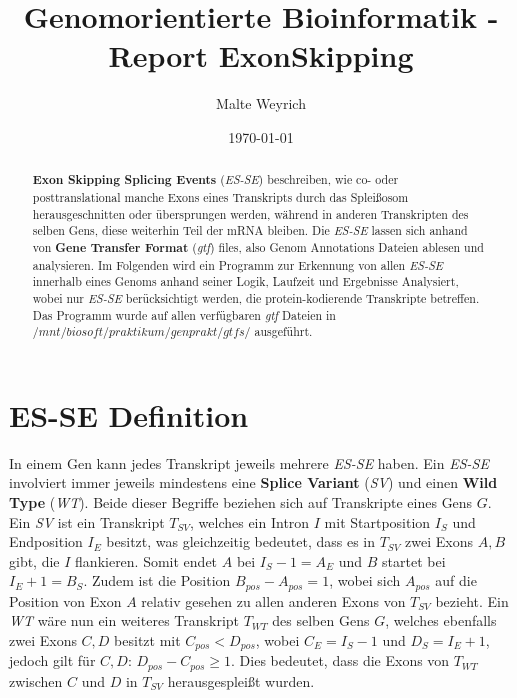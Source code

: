 \documentclass[12pt]{article}
\title{Genomorientierte Bioinformatik - Report ExonSkipping}
\author{
  Malte Weyrich
}
\date{\today}
\begin{document}
\maketitle
\begin{abstract}
    \textbf{Exon Skipping Splicing Events} (\textit{ES-SE}) beschreiben, wie co- oder posttranslational
    manche Exons eines Transkripts durch das Splei\ss osom herausgeschnitten oder übersprungen werden, während
    in anderen Transkripten des selben Gens, diese weiterhin Teil der mRNA bleiben.
    Die \textit{ES-SE} lassen sich anhand von \textbf{Gene Transfer Format} (\textit{gtf}) files,
    also Genom Annotations Dateien ablesen und analysieren. 
    Im Folgenden wird ein Programm zur Erkennung von allen \textit{ES-SE} innerhalb eines Genoms
    anhand seiner Logik, Laufzeit und Ergebnisse Analysiert, wobei nur \textit{ES-SE} berücksichtigt werden,
    die protein-kodierende Transkripte betreffen. Das Programm wurde auf allen verfügbaren
    \textit{gtf} Dateien in $/mnt/biosoft/praktikum/genprakt/gtfs/$ ausgeführt.

\end{abstract}

\newpage



\section{ES-SE Definition}
In einem Gen kann jedes Transkript jeweils mehrere \textit{ES-SE} haben.
Ein \textit{ES-SE} involviert immer jeweils mindestens eine \textbf{Splice Variant} (\textit{SV}) und einen 
\textbf{Wild Type} (\textit{WT}). Beide dieser Begriffe beziehen sich auf Transkripte eines Gens $G$.
Ein \textit{SV} ist ein Transkript $T_{SV}$, welches ein Intron $I$ mit Startposition $I_{S}$ und Endposition
$I_{E}$ besitzt, was gleichzeitig bedeutet, dass es in $T_{SV}$ zwei Exons $A, B$ gibt,
die $I$ flankieren. Somit endet $A$ bei $I_{S} - 1 = A_{E}$ und $B$ startet bei $I_{E} + 1 = B_{S}$.
Zudem ist die Position $B_{pos} - A_{pos} = 1$, wobei sich $A_{pos}$ auf die Position von Exon $A$ relativ gesehen 
zu allen anderen Exons von $T_{SV}$ bezieht.
Ein \textit{WT} wäre nun ein weiteres Transkript $T_{WT}$ des selben Gens $G$, welches ebenfalls
zwei Exons $C, D$ besitzt mit $C_{pos} < D_{pos}$, wobei $C_{E} = I_{S} - 1$ und $D_{S} = I_{E} + 1$, 
jedoch gilt für $C, D$: $D_{pos} - C_{pos} \ge 1$. 
Dies bedeutet, dass die Exons von $T_{WT}$ zwischen $C$ und $D$ in $T_{SV}$ herausgesplei\ss t wurden.
\end{document}
